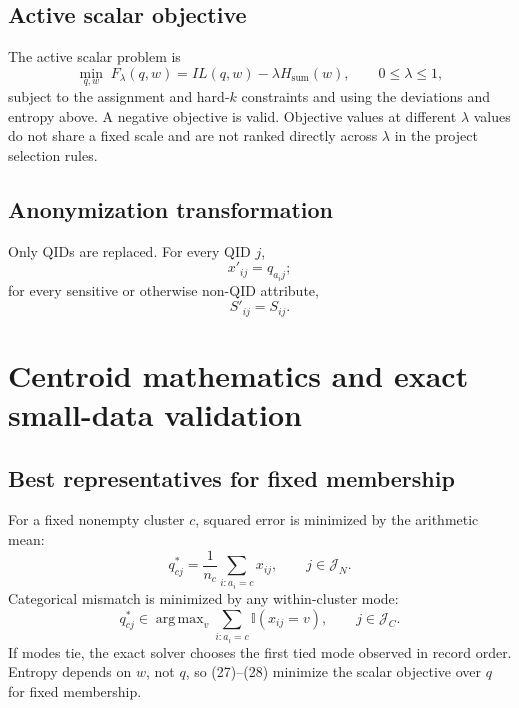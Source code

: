 \documentclass[11pt,a4paper]{article}
\newcommand{\I}{\mathbb{I}}
\DeclareMathOperator*{\argmax}{arg\,max}
\begin{document}
\subsection{Active scalar objective}

The active scalar problem is
\begin{equation}
\min_{q,w}\;F_{\lambda}(q,w)
=IL(q,w)-\lambda H_{\mathrm{sum}}(w),
\qquad 0\le\lambda\le1,
\tag{24}
\end{equation}
subject to the assignment and hard-$k$ constraints and using the deviations
and entropy above.  A negative objective is valid.  Objective values at
different $\lambda$ values do not share a fixed scale and are not ranked
directly across $\lambda$ in the project selection rules.

\subsection{Anonymization transformation}

Only QIDs are replaced.  For every QID $j$,
\begin{equation}
x'_{ij}=q_{a_i j};
\tag{25}
\end{equation}
for every sensitive or otherwise non-QID attribute,
\begin{equation}
S'_{ij}=S_{ij}.
\tag{26}
\end{equation}

\section{Centroid mathematics and exact small-data validation}

\subsection{Best representatives for fixed membership}

For a fixed nonempty cluster $c$, squared error is minimized by the arithmetic
mean:
\begin{equation}
q^*_{cj}=\frac{1}{n_c}\sum_{i:a_i=c}x_{ij},
\qquad j\in\mathcal J_N.
\tag{27}
\end{equation}
Categorical mismatch is minimized by any within-cluster mode:
\begin{equation}
q^*_{cj}\in\argmax_{v}\sum_{i:a_i=c}\I(x_{ij}=v),
\qquad j\in\mathcal J_C.
\tag{28}
\end{equation}
If modes tie, the exact solver chooses the first tied mode observed in record
order.  Entropy depends on $w$, not $q$, so (27)--(28) minimize the scalar
objective over $q$ for fixed membership.
\end{document}
